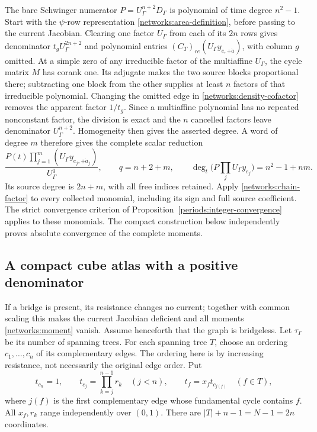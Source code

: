 The bare Schwinger numerator $P=U_\Gamma^{n+2}D_\Gamma$ is polynomial
of time degree $n^2-1$.  Start with the $\psi$-row representation
\eqref{networks:area-definition}, before passing to the current Jacobian.
Clearing one factor $U_\Gamma$ from each of its $2n$ rows gives denominator
$t_gU_\Gamma^{2n+2}$ and polynomial entries
$(C_T)_{re}(U_\Gamma y_{e,+\dot a})$, with column $g$ omitted.
At a simple zero of any irreducible factor
of the multiaffine $U_\Gamma$, the cycle matrix $M$ has corank one.
Its adjugate makes the two source blocks proportional there; subtracting
one block from the other supplies at least $n$ factors of that
irreducible polynomial.  Changing the omitted edge in
\eqref{networks:density-cofactor} removes the apparent factor $1/t_g$.
Since a multiaffine polynomial has no repeated nonconstant factor, the
division is exact and the $n$ cancelled factors leave denominator
$U_\Gamma^{n+2}$.  Homogeneity then gives the asserted degree.
A word of degree $m$ therefore gives the complete scalar reduction
\begin{equation}
 \frac{P(t)\prod_{j=1}^m(U_\Gamma y_{e_j,+\dot a_j})}
      {U_\Gamma^{q}},\qquad
 q=n+2+m,\qquad
 \deg_t\bigl(P\prod_j U_\Gamma y_{e_j}\bigr)=n^2-1+nm.
 \label{networks:scalar-numerator}
\end{equation}
Its source degree is $2n+m$, with all free indices retained.  Apply
\eqref{networks:chain-factor} to every collected monomial, including its
sign and full source coefficient.  The strict convergence criterion of
Proposition~\ref{periods:integer-convergence} applies to these monomials.
The compact construction below independently proves absolute convergence
of the complete moments.

\subsection{A compact cube atlas with a positive denominator}
\label{networks:cubes}

If a bridge is present, its resistance changes no current; together with
common scaling this makes the current Jacobian deficient and all moments
\eqref{networks:moment} vanish.  Assume henceforth that the graph is
bridgeless.  Let $\tau_\Gamma$ be its number of spanning trees.
For each spanning tree $T$, choose an ordering $c_1,\ldots,c_n$ of its
complementary edges.  The ordering here is by increasing resistance,
not necessarily the original edge order.  Put
\begin{equation}
 t_{c_n}=1,\qquad
 t_{c_j}=\prod_{k=j}^{n-1}r_k\quad(j<n),\qquad
 t_f=x_f t_{c_{j(f)}}\quad(f\in T),
 \label{networks:cube-map}
\end{equation}
where $j(f)$ is the first complementary edge whose fundamental cycle
contains $f$.  All $x_f,r_k$ range independently over $(0,1)$.
There are $|T|+n-1=N-1=2n$ coordinates.


